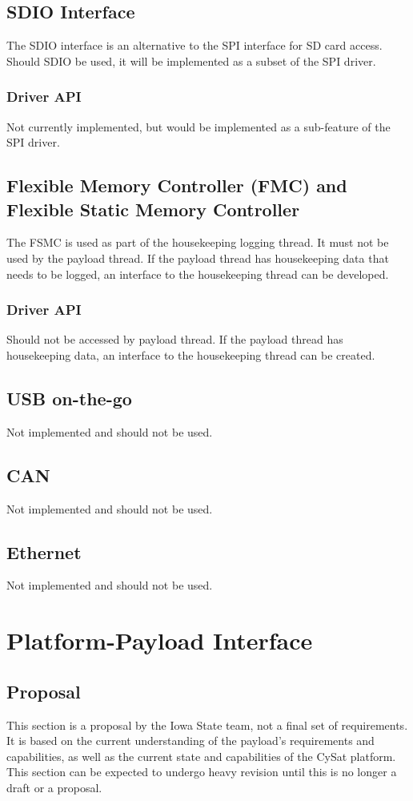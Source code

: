 \documentclass{article}
\begin{document}
\subsection{SDIO Interface}
The SDIO interface is an alternative to the SPI interface for SD card access.
Should SDIO be used, it will be implemented as a subset of the SPI driver.
\subsubsection{Driver API}
Not currently implemented, but would be implemented as a sub-feature of the 
SPI driver.

\subsection{Flexible Memory Controller (FMC) and Flexible Static Memory Controller}
The FSMC is used as part of the housekeeping logging thread. It must 
not be used by 
the payload thread. If the payload thread has housekeeping data that needs to
be logged,
an interface to the housekeeping thread can be developed.
\subsubsection{Driver API}
Should not be accessed by payload thread. If the payload thread has housekeeping data,
an interface to the housekeeping thread can be created.

\subsection{USB on-the-go}
Not implemented and should not be used.

\subsection{CAN}
Not implemented and should not be used.

\subsection{Ethernet}
Not implemented and should not be used.

\section{Platform-Payload Interface}
\subsection{Proposal}
This section is a proposal by the Iowa State team, not
a final set of requirements. It is based on the current understanding of the
payload's requirements and capabilities, as well as the current state and 
capabilities of the CySat platform. This section can be expected
to undergo heavy revision until this is no longer a draft or
a proposal.
\end{document}
